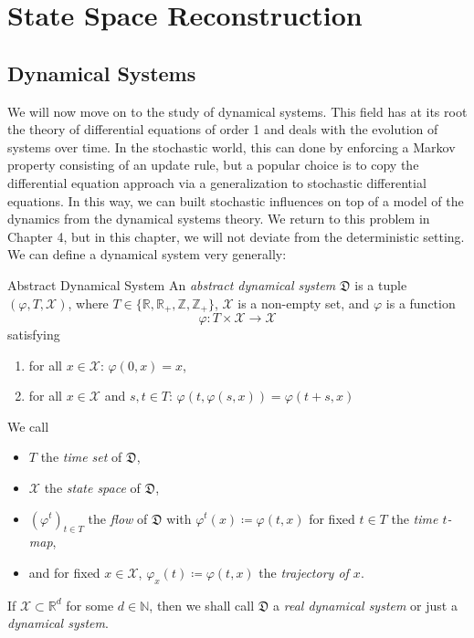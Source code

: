 \documentclass[11pt, a4paper]{memoir}
\theoremstyle{break}
\theoremstyle{break}
\theoremstyle{nonumberplain}
\newcommand{\mN}{\mathbb{N}}
\newcommand{\mZ}{\mathbb{Z}}
\newcommand{\mR}{\mathbb{R}}
\begin{document}
\chapter{State Space Reconstruction}


\section{Dynamical Systems}
We will now move on to the study of dynamical systems. This field has at its root the theory of differential equations  of order 1 and deals with the evolution of systems over time. In the stochastic world, this can done by enforcing a Markov property consisting of an update rule, but a popular choice is to copy the differential equation approach via a generalization to stochastic differential equations. In this way, we can built stochastic influences on top of a model of the dynamics from the dynamical systems theory. We return to this problem in Chapter 4, but in this chapter, we will not deviate from the deterministic setting. We can define a dynamical system very generally:
\begin{mydefinition}{Abstract Dynamical System}
An \emph{abstract dynamical system} $\mathfrak{D}$ is a tuple $(\varphi, T,\mathcal{X})$, where $T\in \{\mR,\mR_+,\mZ,\mZ_+\}$, $\mathcal{X}$ is a non-empty set, and $\varphi$ is a function
$$\varphi: T\times \mathcal{X}\to \mathcal{X}$$
satisfying
\begin{enumerate}[label=(\roman*)]
	\item for all $x\in \mathcal{X}$: $\varphi(0,x)=x$,
	\item for all $x\in \mathcal{X}$ and $s,t \in T$: $\varphi(t,\varphi(s,x))=\varphi(t+s,x)$
\end{enumerate}
We call 
\begin{itemize}
\item $T$ the \emph{time set} of $\mathfrak{D}$, 
\item $\mathcal{X}$ the \emph{state space} of $\mathfrak{D}$, 
\item $(\varphi^t)_{t\in T}$ the \emph{flow} of $\mathfrak{D}$ with
$\varphi^t(x)\coloneqq \varphi(t,x)$ for fixed $t\in T$ the \emph{time $t$-map},
\item and for fixed $x\in \mathcal{X}$, $\varphi_x(t)\coloneqq \varphi(t,x)$ the \emph{trajectory of $x$}.
\end{itemize}
If $\mathcal{X}\subset \mR^d$ for some $d\in \mN$, then we shall call $\mathfrak{D}$ a \emph{real dynamical system} or just a \emph{dynamical system}.
\end{mydefinition}
\end{document}
